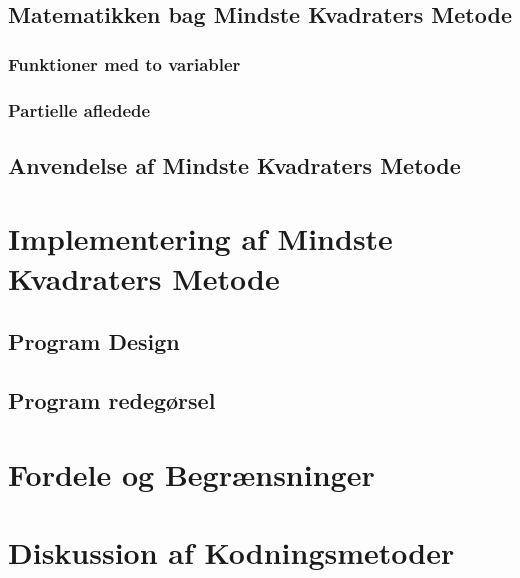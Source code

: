 \subsection{Matematikken bag Mindste Kvadraters Metode}

\subsubsection{Funktioner med to variabler}

\subsubsection{Partielle afledede}

\subsection{Anvendelse af Mindste Kvadraters Metode}


\section{Implementering af Mindste Kvadraters Metode}


\subsection{Program Design}

\subsection{Program redegørsel}

\section{Fordele og Begrænsninger}

\section{Diskussion af Kodningsmetoder}
